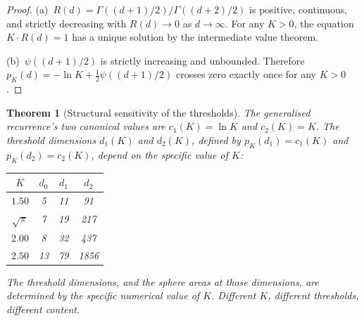 \documentclass[11pt,a4paper]{article}
\newtheorem{theorem}{Theorem}[section]
\begin{document}
\begin{proof}
(a)~$R(d) = \Gamma((d+1)/2)/\Gamma((d+2)/2)$ is positive, continuous, and
strictly decreasing with $R(d)\to 0$ as $d\to\infty$. For any $K > 0$,
the equation $K\cdot R(d) = 1$ has a unique solution by the intermediate
value theorem.

(b)~$\psi((d+1)/2)$ is strictly increasing and unbounded. Therefore
$p_K(d) = -\ln K + \frac{1}{2}\psi((d+1)/2)$ crosses zero exactly once
for any $K > 0$.
\end{proof}

\begin{theorem}[Structural sensitivity of the thresholds]\label{thm:sensitive}
The generalised recurrence's two canonical values are $c_1(K) = \ln K$
and $c_2(K) = K$. The threshold dimensions $d_1(K)$ and $d_2(K)$, defined
by $p_K(d_1) = c_1(K)$ and $p_K(d_2) = c_2(K)$, depend on the specific
value of $K$:

\begin{center}
\begin{tabular}{cccc}
\toprule
$K$ & $d_0$ & $d_1$ & $d_2$ \\
\midrule
$1.50$ & 5 & 11 & 91 \\
$\sqrt{\pi}$ & 7 & 19 & 217 \\
$2.00$ & 8 & 32 & 437 \\
$2.50$ & 13 & 79 & 1856 \\
\bottomrule
\end{tabular}
\end{center}

The threshold dimensions, and the sphere areas at those dimensions, are
determined by the specific numerical value of $K$. Different $K$, different
thresholds, different content.
\end{theorem}
\end{document}

